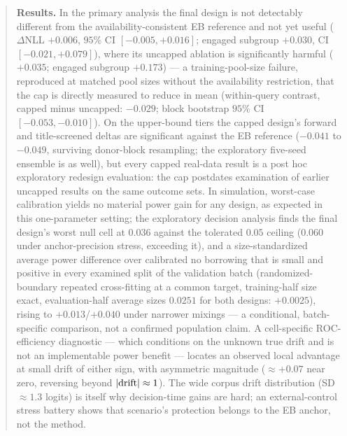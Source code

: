 \documentclass[11pt]{article}
\begin{document}
\begin{abstract}
\noindent\textbf{Results.} In the primary analysis the final design is
not detectably different from the availability-consistent EB reference
and not yet useful ($\Delta$NLL $+0.006$, $95\%$ CI
$[-0.005,+0.016]$; engaged subgroup $+0.030$, CI $[-0.021,+0.079]$),
where its uncapped ablation is significantly harmful ($+0.035$; engaged
subgroup $+0.173$) --- a training-pool-size failure, reproduced at
matched pool sizes without the availability restriction, that the cap is
directly measured to reduce in mean (within-query contrast, capped
minus uncapped: $-0.029$; block bootstrap $95\%$ CI
$[-0.053,-0.010]$). On the upper-bound tiers the capped design's
forward and title-screened deltas are significant against the EB
reference ($-0.041$ to $-0.049$, surviving
donor-block resampling; the exploratory five-seed ensemble is as
well), but every capped real-data result is a post hoc
exploratory redesign evaluation: the cap postdates examination of earlier
uncapped results on the same outcome sets. In simulation, worst-case
calibration yields no material power gain for any design, as expected in
this one-parameter setting; the exploratory decision analysis finds the
final design's worst null cell at $0.036$ against the tolerated $0.05$
ceiling ($0.060$ under anchor-precision stress, exceeding it), and a
size-standardized average power difference over calibrated no borrowing
that is small and positive in every examined split of the validation
batch (randomized-boundary repeated cross-fitting at a common target,
training-half size exact, evaluation-half average sizes $0.0251$ for
both designs: $+0.0025$), rising
to $+0.013$/$+0.040$ under narrower mixings --- a conditional,
batch-specific comparison, not a confirmed population claim. A cell-specific ROC-efficiency
diagnostic --- which conditions on the unknown true drift and is not an
implementable power benefit --- locates an observed local advantage at
small drift of either sign, with asymmetric magnitude ($\approx +0.07$
near zero, reversing beyond $|{\rm drift}| \approx 1$). The wide corpus
drift distribution (SD $\approx 1.3$ logits) is itself why decision-time
gains are hard; an external-control stress battery shows that scenario's
protection belongs to the EB anchor, not the method.


\end{abstract}
\end{document}
